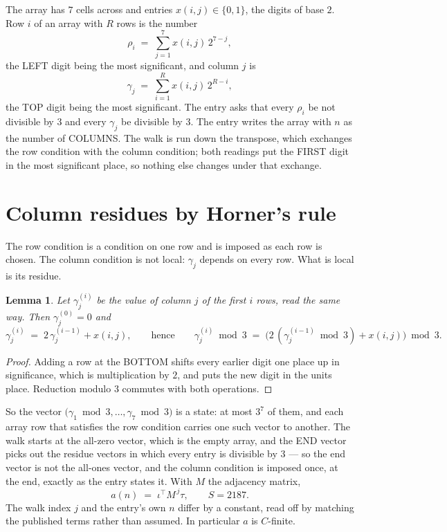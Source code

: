 \documentclass[11pt,a4paper]{article}
\theoremstyle{plain}
\newtheorem{lemma}[theorem]{Lemma}
\theoremstyle{definition}
\begin{document}
The array has $7$ cells across and entries $x(i,j)\in\{0,1\}$, the digits of
base $2$. Row $i$ of an array with $R$ rows is the number
\[
\rho_i\;=\;\sum_{j=1}^{7}x(i,j)\,2^{7-j} ,
\]
the LEFT digit being the most significant, and column $j$ is
\[
\gamma_j\;=\;\sum_{i=1}^{R}x(i,j)\,2^{R-i} ,
\]
the TOP digit being the most significant. The entry asks that every $\rho_i$ be not divisible by
$3$ and every $\gamma_j$ be divisible by $3$. The entry writes the array with $n$ as the number of COLUMNS. The walk is run down the transpose, which exchanges the row condition with the column condition; both readings put the FIRST digit in the most significant place, so nothing else changes under that exchange.


\section{Column residues by Horner's rule}

The row condition is a condition on one row and is imposed as each row is chosen. The column
condition is not local: $\gamma_j$ depends on every row. What is local is its residue.

\begin{lemma}\label{lem:horner}
Let $\gamma_j^{(i)}$ be the value of column $j$ of the first $i$ rows, read the same way.
Then $\gamma_j^{(0)}=0$ and
\[
\gamma_j^{(i)}\;=\;2\,\gamma_j^{(i-1)}+x(i,j),
\qquad\text{hence}\qquad
\gamma_j^{(i)}\bmod 3\;=\;
\bigl(2\,(\gamma_j^{(i-1)}\bmod 3)+x(i,j)\bigr)\bmod 3 .
\]
\end{lemma}

\begin{proof}
Adding a row at the BOTTOM shifts every earlier digit one place up in significance, which is
multiplication by $2$, and puts the new digit in the units place. Reduction modulo
$3$ commutes with both operations.
\end{proof}

So the vector $\bigl(\gamma_1\bmod 3,\dots,\gamma_{7}\bmod
3\bigr)$ is a state: at most $3^{7}$ of them, and each array row
that satisfies the row condition carries one such vector to another. The walk starts at the
all-zero vector, which is the empty array, and the END vector picks out the residue vectors in
which every entry is divisible by $3$ --- so the end vector is not the all-ones
vector, and the column condition is imposed once, at the end, exactly as the entry states it.
With $M$ the adjacency matrix,
\[
a(n)\;=\;\iota^{\!\top}M^{\,j}\tau ,\qquad S=2187.
\]
The walk index $j$ and the entry's own $n$ differ by a constant, read off by matching the
published terms rather than assumed. In particular $a$ is $C$-finite.
\end{document}
